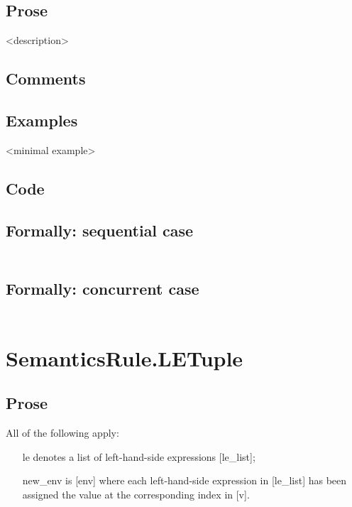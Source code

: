 \documentclass{book}
\begin{document}
    \subsection{Prose}
    <description>

    \subsection{Comments}

    \subsection{Examples}
    <minimal example>

  \subsection{Code}

  \subsection{Formally: sequential case}
  \begin{align}
  \end{align} 

  \subsection{Formally: concurrent case}
  \begin{align}
  \end{align} 

\section{SemanticsRule.LETuple \label{sec:SemanticsRule.LETuple}}

    \subsection{Prose}
    All of the following apply:
    \begin{itemize}
    \item [le] denotes a list of left-hand-side expressions [le\_list];
    \item [new\_env] is [env] where each left-hand-side expression in [le\_list] has
      been assigned the value at the corresponding index in [v].
    \end{itemize}
\end{document}
